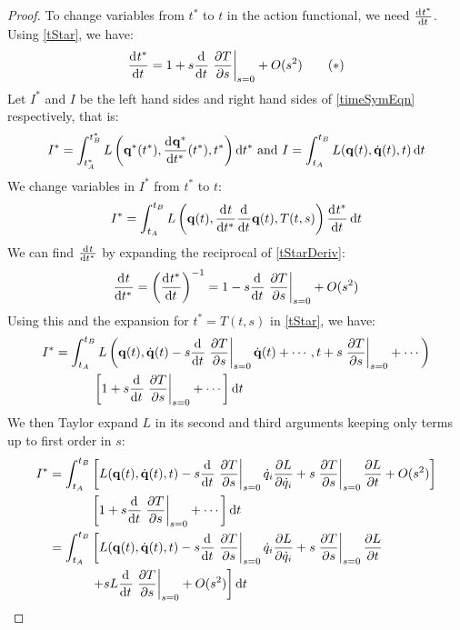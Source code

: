 \documentclass[../main.tex]{subfiles}
\begin{document}
\begin{proof}
  To change variables from $t^{*}$ to $t$ in the action functional, we need $\deriv{t^{*}}{t}$.
  Using \cref{tStar}, we have:
  \begin{equation}
    \deriv{{t^{*}}}{t} = 1 + s \deriv{}{t}\at{\pderiv{T}{s}}{s = 0} + O(s^2) \tag{$\ast$} \label{tStarDeriv}
  \end{equation}
  Let $I^{*}$ and $I$ be the left hand sides and right hand sides of \cref{timeSymEqn} respectively, that is:
  \[
    I^{*} = \int_{t^{*}_A}^{t^{*}_B} L\left(\vec{q}^{*}(t^{*}), \deriv{\vec{q}^{*}}{{t^{*}}}(t^{*}), t^{*}\right) \d{t^{*}} \text{ and } I = \int_{t_{A}}^{t_{B}} L(\vec{q}(t), \dot{\vec{q}}(t), t) \d{t}
  \]
  We change variables in $I^{*}$ from $t^{*}$ to $t$:
  \[
    I^{*} = \int_{t_A}^{t_B} L\left(\vec{q}(t), \deriv{t}{{t^{*}}} \deriv{}{t}\vec{q}(t), T(t, s)\right) \deriv{t^{*}}{t} \d{t}
  \]
  We can find $\deriv{t}{{t^{*}}}$ by expanding the reciprocal of \cref{tStarDeriv}:
  \[
    \deriv{t}{{t^{*}}} = \left(\deriv{t^{*}}{t}\right)^{-1} = 1 - s \deriv{}{t} \at{\pderiv{T}{s}}{s = 0} + O(s^2)
  \]
  Using this and the expansion for $t^{*} = T(t, s)$ in \cref{tStar}, we have:
  \begin{align*}
    I^{*} &= \int_{t_A}^{t_B} L\left(\vec{q}(t), \dot{\vec{q}}(t) - s \deriv{}{t}\at{\pderiv{T}{s}}{s = 0} \dot{\vec{q}}(t) + \cdots, t + s \at{\pderiv{T}{s}}{s = 0} + \cdots\right) \\
          &\quad\qquad\left[1 + s \deriv{}{t}\at{\pderiv{T}{s}}{s = 0} + \cdots\right] \d{t} \\
  \end{align*}
  We then Taylor expand $L$ in its second and third arguments keeping only terms up to first order in $s$:
  \begin{align*}
   I^{*} &= \int_{t_A}^{t_B} \left[L(\vec{q}(t), \dot{\vec{q}}(t), t) - s \deriv{}{t}\at{\pderiv{T}{s}}{s = 0} \dot{q}_i \pderiv{L}{\dot{q}_i} + s \at{\pderiv{T}{s}}{s=0} \pderiv{L}{t} + O(s^2) \right] \\
         &\hspace{1.15cm}\left[1 + s \deriv{}{t}\at{\pderiv{T}{s}}{s = 0} + \cdots\right] \d{t} \\
         &= \int_{t_A}^{t_B} \left[L(\vec{q}(t), \dot{\vec{q}}(t), t) - s \deriv{}{t}\at{\pderiv{T}{s}}{s = 0} \dot{q}_i \pderiv{L}{\dot{q}_i} + s \at{\pderiv{T}{s}}{s=0} \pderiv{L}{t} \right. \\
         &\left.\hspace{1.15cm}+ sL \deriv{}{t}\at{\pderiv{T}{s}}{s = 0} + O(s^2)\right] \d{t} \\

\end{align*}
\end{proof}
\end{document}
